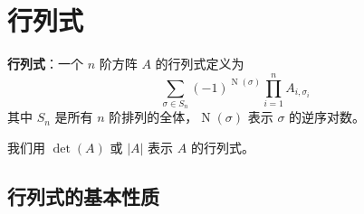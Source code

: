 \section{行列式}

\begin{tcolorbox}
    \textbf{行列式}：一个 $n$ 阶方阵 $A$ 的行列式定义为
    $$\sum_{\sigma\in S_n} (-1)^{\operatorname{N}(\sigma)}\prod_{i=1}^{n} A_{i,\sigma_i}$$
    其中 $S_n$ 是所有 $n$ 阶排列的全体，$\operatorname{N}(\sigma)$ 表示 $\sigma$ 的逆序对数。

    我们用 $\det(A)$ 或 $|A|$ 表示 $A$ 的行列式。
\end{tcolorbox}

\subsection{行列式的基本性质}

